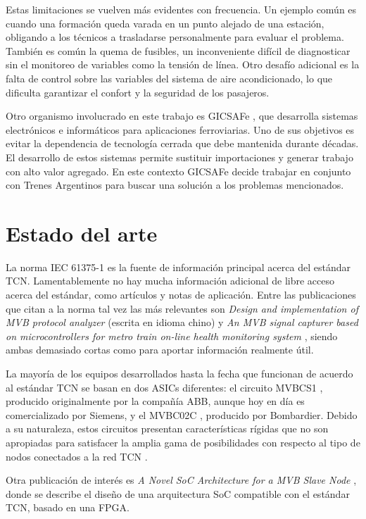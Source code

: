 Estas limitaciones se vuelven más evidentes con frecuencia. Un ejemplo común es cuando una formación queda varada en un punto alejado de una estación, obligando a los técnicos a trasladarse personalmente para evaluar el problema.
También es común la quema de fusibles, un inconveniente difícil de diagnosticar sin el monitoreo de variables como la tensión de línea.
Otro desafío adicional es la falta de control sobre las variables del sistema de aire acondicionado, lo que dificulta garantizar el confort y la seguridad de los pasajeros.

Otro organismo involucrado en este trabajo es GICSAFe \cite{web:gicsafe}, que desarrolla sistemas electrónicos e informáticos para aplicaciones ferroviarias. Uno de sus objetivos es evitar la dependencia de tecnología cerrada que debe mantenida durante décadas. El desarrollo de estos sistemas permite sustituir importaciones y generar trabajo con alto valor agregado. En este contexto GICSAFe decide trabajar en conjunto con Trenes Argentinos para buscar una solución a los problemas mencionados.

\section{Estado del arte}

La norma IEC 61375-1 es la fuente de información principal acerca del estándar TCN. Lamentablemente no hay mucha información adicional de libre acceso acerca del estándar, como artículos y notas de aplicación. Entre las publicaciones que citan a la norma tal vez las más relevantes son \textit{Design and implementation of MVB protocol analyzer} \cite{mvb-pub-1} (escrita en idioma chino) y \textit{An MVB signal capturer based on microcontrollers for metro train on-line health monitoring system} \cite{mvb-pub-2}, siendo ambas demasiado cortas como para aportar información realmente útil.

La mayoría de los equipos desarrollados hasta la fecha que funcionan de acuerdo al estándar TCN se basan en dos ASICs diferentes: el circuito MVBCS1 \cite{mvbcs1}, producido originalmente por la compañía ABB, aunque hoy en día es comercializado por Siemens, y el MVBC02C \cite{mvbc02c}, producido por Bombardier. Debido a su naturaleza, estos circuitos presentan características rígidas que no son apropiadas para satisfacer la amplia gama de posibilidades con respecto al tipo de nodos conectados a la red TCN \cite{mvb-pub-3}.

Otra publicación de interés es \textit{A Novel SoC Architecture for a MVB Slave Node} \cite{mvb-pub-3}, donde se describe el diseño de una arquitectura SoC compatible con el estándar TCN, basado en una FPGA.

